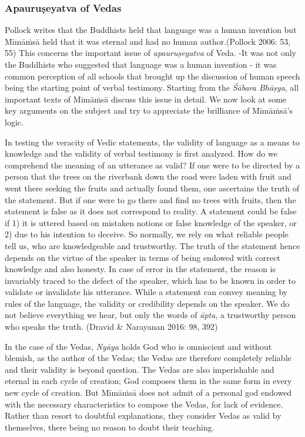\vspace{-.3cm}

\subsubsection*{Apauruṣeyatva of Vedas}

Pollock writes that the Buddhists held that language was a human invention but Mīmāṁsā held that it was eternal and had no human author.(Pollock 2006: 53, 55) This concerns the important issue of \textit{apauruṣeyatva} of Veda. -It was not only the Buddhists who suggested that language was a human invention - it was common perception of all schools that brought up the discussion of human speech being the starting point of verbal testimony. Starting from the \textit{Śābara Bhāṣya}, all important texts of Mīmāṁsā discuss this issue in detail. We now look at some key arguments on the subject and try to appreciate the brilliance of Mīmāṁsā’s logic.

In testing the veracity of Vedic statements, the validity of language as a means to knowledge and the validity of verbal testimony is first analyzed. How do we comprehend the meaning of an utterance as valid? If one were to be directed by a person that the trees on the riverbank down the road were laden with fruit and went there seeking the fruits and actually found them, one ascertains the truth of the statement. But if one were to go there and find no trees with fruits, then the statement is false as it does not correspond to reality. A statement could be false if 1) it is uttered based on mistaken notions or false knowledge of the speaker, or 2) due to his intention to deceive. So normally, we rely on what reliable people tell us, who are knowledgeable and trustworthy. The truth of the statement hence depends on the virtue of the speaker in terms of being endowed with correct knowledge and also honesty. In case of error in the statement, the reason is invariably traced to the defect of the speaker, which has to be known in order to validate or invalidate his utterance. While a statement can convey meaning by rules of the language, the validity or credibility depends on the speaker. We do not believe everything we hear, but only the words of \textit{āpta}, a trustworthy person who speaks the truth. (Dravid \& Narayanan 2016: 98, 392)

In the case of the Vedas, \textit{Nyāya} holds God who is omniscient and without blemish, as the author of the Vedas; the Vedas are therefore completely reliable and their validity is beyond question. The Vedas are also imperishable and eternal in each cycle of creation; God composes them in the same form in every new cycle of creation. But Mīmāṁsā does not admit of a personal god endowed with the necessary characteristics to compose the Vedas, for lack of evidence. Rather than resort to doubtful explanations, they consider Vedas as valid by themselves, there being no reason to doubt their teaching.

